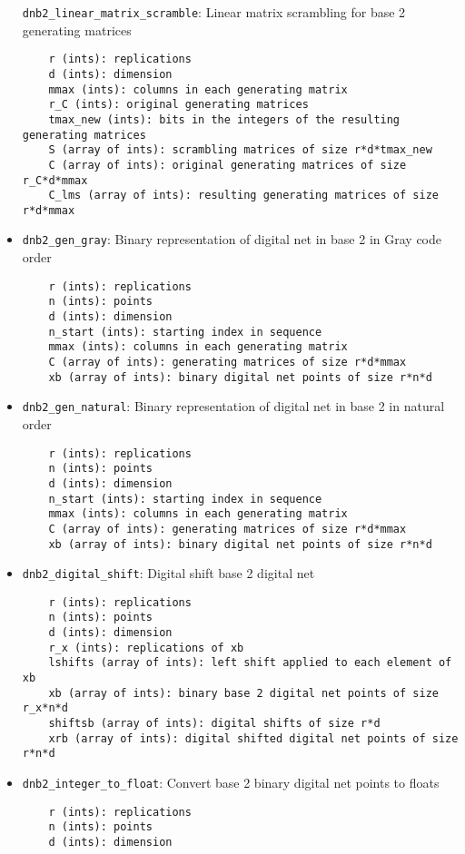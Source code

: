 \begin{itemize}
\texttt{dnb2\_linear\_matrix\_scramble}: 
Linear matrix scrambling for base 2 generating matrices
\begin{lstlisting}
	r (ints): replications
    d (ints): dimension
    mmax (ints): columns in each generating matrix 
    r_C (ints): original generating matrices
    tmax_new (ints): bits in the integers of the resulting generating matrices
    S (array of ints): scrambling matrices of size r*d*tmax_new
    C (array of ints): original generating matrices of size r_C*d*mmax
    C_lms (array of ints): resulting generating matrices of size r*d*mmax
\end{lstlisting}
\item
\texttt{dnb2\_gen\_gray}: 
Binary representation of digital net in base 2 in Gray code order
\begin{lstlisting}
	r (ints): replications
    n (ints): points
    d (ints): dimension
    n_start (ints): starting index in sequence
    mmax (ints): columns in each generating matrix
    C (array of ints): generating matrices of size r*d*mmax
    xb (array of ints): binary digital net points of size r*n*d
\end{lstlisting}
\item
\texttt{dnb2\_gen\_natural}: 
Binary representation of digital net in base 2 in natural order
\begin{lstlisting}
	r (ints): replications
    n (ints): points
    d (ints): dimension
    n_start (ints): starting index in sequence
    mmax (ints): columns in each generating matrix
    C (array of ints): generating matrices of size r*d*mmax
    xb (array of ints): binary digital net points of size r*n*d
\end{lstlisting}
\item
\texttt{dnb2\_digital\_shift}: 
Digital shift base 2 digital net
\begin{lstlisting}
	r (ints): replications
    n (ints): points
    d (ints): dimension
    r_x (ints): replications of xb
    lshifts (array of ints): left shift applied to each element of xb
    xb (array of ints): binary base 2 digital net points of size r_x*n*d
    shiftsb (array of ints): digital shifts of size r*d
    xrb (array of ints): digital shifted digital net points of size r*n*d
\end{lstlisting}
\item
\texttt{dnb2\_integer\_to\_float}: 
Convert base 2 binary digital net points to floats
\begin{lstlisting}
	r (ints): replications
    n (ints): points
    d (ints): dimension

\end{lstlisting}
\end{itemize}
